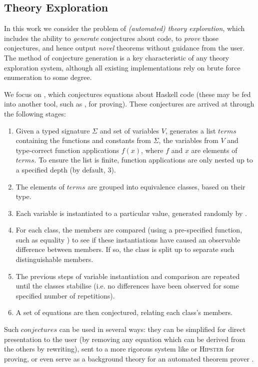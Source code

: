 \subsection{Theory Exploration}
\label{sec:theoryexploration}

In this work we consider the problem of \emph{(automated) theory exploration}, which includes the ability to \emph{generate} conjectures about code, to \emph{prove} those conjectures, and hence output \emph{novel} theorems without guidance from the user. The method of conjecture generation is a key characteristic of any theory exploration system, although all existing implementations rely on brute force enumeration to some degree.

We focus on \qspec{} \citep{QuickSpec}, which conjectures equations about Haskell code (these may be fed into another tool, such as \hspec{}, for proving). These conjectures are arrived at through the following stages:

\begin{enumerate}
  \item Given a typed signature $\Sigma$ and set of variables $V$, \qspec{} generates a list $terms$ containing the functions and constants from $\Sigma$, the variables from $V$ and type-correct function applications $f(x)$, where $f$ and $x$ are elements of $terms$. To ensure the list is finite, function applications are only nested up to a specified depth (by default, 3).
  \item The elements of $terms$ are grouped into equivalence classes, based on their type.
  \item Each variable is instantiated to a particular value, generated randomly by \qcheck{}.
  \item For each class, the members are compared (using a pre-specified function, such as equality \hs{==}) to see if these instantiations have caused an observable difference between members. If so, the class is split up to separate such distinguishable members.
  \item The previous steps of variable instantiation and comparison are repeated until the classes stabilise (i.e. no differences have been observed for some specified number of repetitions).
  \item A set of equations are then conjectured, relating each class's members.
\end{enumerate}

Such $conjectures$ can be used in several ways: they can be simplified for direct presentation to the user (by removing any equation which can be derived from the others by rewriting), sent to a more rigorous system like \hspec{} or \textsc{Hipster} for proving, or even serve as a background theory for an automated theorem prover \citep{claessen2013automating}.

